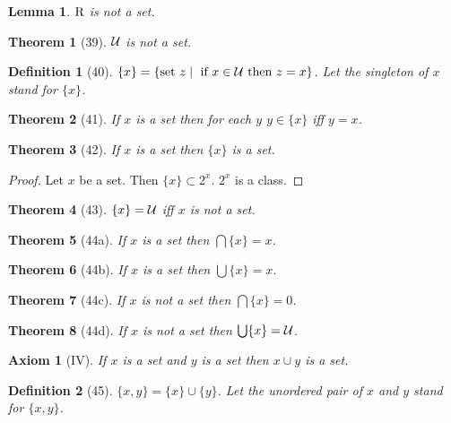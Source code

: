 \documentclass{scrartcl}
\newtheorem*{axiom}{Axiom}
\newtheorem*{lemma}{Lemma}
\newtheorem*{theorem}{Theorem}
\newtheorem*{definition}{Definition}
\newcommand{\sing}[1]{\{{#1}\}}
\newcommand{\pair}[2]{\{{#1},{#2}\}}
\begin{document}
\begin{lemma} ${\rm R}$ is not a set. \end{lemma}

\begin{theorem}[39] ${\cal U}$ is not a set.
\end{theorem}

\begin{definition}[40] $\sing{x} = 
\{\text{set } z \mid \text{ if } x \in {\cal U} \text{ then } z = x\}$.
Let the \emph{singleton} of $x$ stand for $\sing{x}$.
\end{definition}

\begin{theorem}[41] If $x$ is a set then 
for each $y$ $y \in \sing{x}$ iff $y = x$.
\end{theorem}

\begin{theorem}[42] If $x$ is a set then 
$\sing{x}$ is a set.
\end{theorem}
\begin{proof} Let $x$ be a set. Then $\sing{x} \subset 2^{x}$. 
$2^{x}$ is a class.
\end{proof}

\begin{theorem}[43] $\sing{x} = {\cal U}$ iff $x$ is not a set.
\end{theorem}

\begin{theorem}[44a] If $x$ is a set then $\bigcap \sing{x} = x$.
\end{theorem}
\begin{theorem}[44b] If $x$ is a set then $\bigcup \sing{x} = x$.
\end{theorem}
\begin{theorem}[44c] If $x$ is not a set then $\bigcap \sing{x} = 0$.
\end{theorem}
\begin{theorem}[44d] If $x$ is not a set then $\bigcup \sing{x} = {\cal U}$.
\end{theorem}

\begin{axiom}[IV] If $x$ is a set and $y$ is a set then $x \cup y$ is a set.
\end{axiom}

\begin{definition}[45] $\pair{x}{y} = \sing{x} \cup \sing{y}$.
Let the \emph{unordered pair} of $x$ and $y$ stand for $\pair{x}{y}$.
\end{definition}
\end{document}
